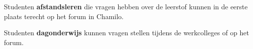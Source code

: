 Studenten \textbf{afstandsleren} die vragen hebben over de leerstof kunnen in de eerste plaats terecht op het forum in Chamilo. 

Studenten \textbf{dagonderwijs} kunnen vragen stellen tijdens de werkcolleges of  op het forum.



